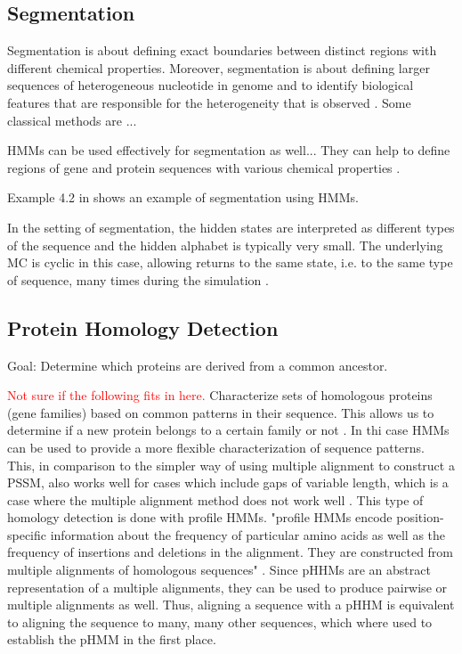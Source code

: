 \documentclass{article}
\begin{document}
\subsection{Segmentation}
Segmentation is about defining exact boundaries between distinct regions with different chemical properties. Moreover, segmentation is about defining larger sequences of heterogeneous nucleotide in genome and to identify biological features that are responsible for the heterogeneity that is observed \cite{Christianini2006}. Some classical methods are ...

HMMs can be used effectively for segmentation as well... They can help to define regions of gene and protein sequences with various chemical properties \cite{Christianini2006}. 

Example 4.2 in \cite{Christianini2006} shows an example of segmentation using HMMs.

In the setting of segmentation, the hidden states are interpreted as different types of the sequence and the hidden alphabet is typically very small. The underlying MC is cyclic in this case, allowing returns to the same state, i.e. to the same type of sequence, many times during the simulation \cite{Christianini2006}. 

\subsection{Protein Homology Detection}
Goal: Determine which proteins are derived from a common ancestor. 

\textcolor{red}{Not sure if the following fits in here.}
Characterize sets of homologous proteins (gene families) based on common patterns in their sequence. This allows us to determine if a new protein belongs to a certain family or not \cite{Christianini2006}. In thi case HMMs can be used to provide a more flexible characterization of sequence patterns. This, in comparison to the simpler way of using multiple alignment to construct a PSSM, also works well for cases which include gaps of variable length, which is a case where the multiple alignment method does not work well \cite{Christianini2006}. This type of homology detection is done with profile HMMs. "proﬁle HMMs encode position-speciﬁc information about
the frequency of particular amino acids as well as the frequency of insertions
and deletions in the alignment. They are constructed from multiple alignments
of homologous sequences" \cite{Christianini2006}. Since pHHMs are an abstract representation of a multiple alignments, they can be used to produce pairwise or multiple alignments as well. Thus, aligning a sequence with a pHHM is equivalent to aligning the sequence to many, many other sequences, which where used to establish the pHMM in the first place. 
\end{document}
